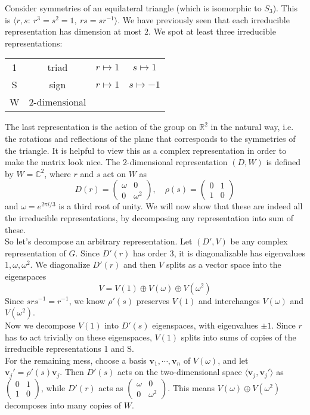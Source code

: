 \documentclass[a4paper]{article}
\begin{document}
\begin{eg}
  Consider symmetries of an equilateral triangle (which is isomorphic to $S_3$). This is $\langle r, s:~r^3 = s^2 = 1,~rs = sr^{-1}\rangle$. We have previously seen that each irreducible representation has dimension at most $2$. We spot at least three irreducible representations:
  \begin{center}
    \begin{tabular}{cccc}
      1 & triad & $r \mapsto 1$ & $s \mapsto 1$\\
      S & sign & $r \mapsto 1$ & $s \mapsto -1$\\
      W & $2$-dimensional &
    \end{tabular}
  \end{center}
  The last representation is the action of the group on $\mathbb{R}^2$ in the natural way, i.e. the rotations and reflections of the plane that corresponds to the symmetries of the triangle. It is helpful to view this as a complex representation in order to make the matrix look nice. The $2$-dimensional representation $(D, W)$ is defined by $W = \mathbb{C}^2$, where $r$ and $s$ act on $W$ as
$$D(r) =
    \begin{pmatrix}
      \omega & 0\\
      0 & \omega^2
    \end{pmatrix},\quad
    \rho(s) =
    \begin{pmatrix}
      0 & 1\\
      1 & 0
    \end{pmatrix}$$
  and $\omega = e^{2\pi i/3}$ is a third root of unity. We will now show that these are indeed all the irreducible representations, by decomposing any representation into sum of these.\\[5pt]
  So let's decompose an arbitrary representation. Let $(D', V)$ be any complex representation of $G$. Since $D'(r)$ has order $3$, it is diagonalizable has eigenvalues $1, \omega, \omega^2$. We diagonalize $D'(r)$ and then $V$ splits as a vector space into the eigenspaces
$$V = V(1) \oplus V(\omega) \oplus V(\omega^2)$$
  Since $srs^{-1}= r^{-1}$, we know $\rho'(s)$ preserves $V(1)$ and interchanges $V(\omega)$ and $V(\omega^2)$.\\[5pt]
  Now we decompose $V(1)$ into $D'(s)$ eigenspaces, with eigenvalues $\pm1$. Since $r$ has to act trivially on these eigenspaces, $V(1)$ splits into sums of copies of the irreducible representations 1 and S.\\[5pt]
  For the remaining mess, choose a basis $\mathbf{v}_1, \cdots, \mathbf{v}_n$ of $V(\omega)$, and let $\mathbf{v}_j' = \rho'(s) \mathbf{v}_j$. Then $D'(s)$ acts on the two-dimensional space $\langle \mathbf{v}_j, \mathbf{v}_j'\rangle$ as $\begin{pmatrix}0 & 1\\1 & 0\end{pmatrix}$, while $D'(r)$ acts as $\begin{pmatrix} \omega & 0\\0 & \omega^2\end{pmatrix}$. This means $V(\omega) \oplus V(\omega^2)$ decomposes into many copies of $W$.
\end{eg}
\end{document}
